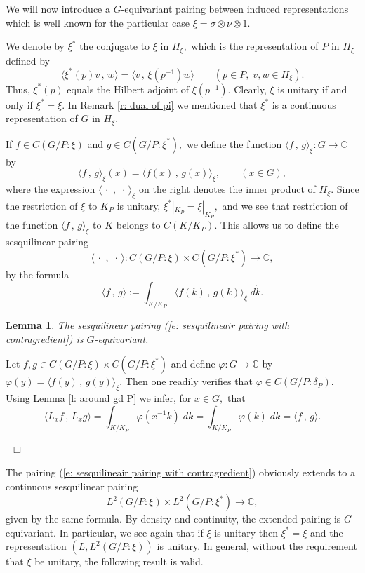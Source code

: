 \documentclass[12pt,a4paper]{article}
\newtheorem{Lemma}[Thm]{Lemma}
\newenvironment{lemma}[0]{\begin{Lemma}\noindent}%
{\end{Lemma}}
\def\proof{\par\noindent{\it Proof.}{\ }{\ }}
\def\qed{~\hfill\hbox{$\Box$}\medbreak}
\def\qquad{\quad\quad}
\def\msy#1{{\mathbb #1}}
\def\C{{\msy C}}
\def\gd{\delta}
\def\gf{\varphi}
\def\gs{\sigma}
\def\to{\rightarrow}
\def\inp#1#2{\langle#1\,,\,#2\rangle}
\numberwithin{Thm}{section}
\numberwithin{equation}{section}
\def\dotvar{\, \cdot\,}
\numberwithin{equation}{section}
\begin{document}
We will now introduce a $G$-equivariant pairing between induced 
representations which is well known for the particular case 
$\xi = \gs \otimes \nu \otimes 1.$ 

We denote by $\xi^*$ the conjugate to $\xi$ in $H_\xi,$  which is the  representation 
of $P$ in $H_\xi$ defined by 
$$ 
\inp{\xi^*(p) v}{w} = \inp{v}{\xi(p^{-1})w} \qquad (p \in P, \;v,w \in H_\xi).
$$%
Thus, $\xi^*(p)$ equals the Hilbert adjoint  of $\xi(p^{-1}).$ Clearly,  $\xi$ is unitary if and only if $\xi^* = \xi.$ In Remark \ref{r: dual of pi} we mentioned that $\xi^*$ is a continuous representation 
of $G$ in $H_\xi.$ 
  
If $f \in C(G/P: \xi)$ and $g \in C(G/P: \xi^*),$ we define
the function  $\inp{f}{g}_\xi: G \to \C$ by 
$$ 
\inp{f}{g}_\xi(x)= \inp{f(x)}{g(x)}_{\xi}, \qquad (x \in G),
$$%
where the expression $\inp{\dotvar}{\dotvar}_\xi$ on the right denotes the inner product of $H_\xi.$ 
Since the restriction of $\xi$ to $K_P$ is unitary, $\xi^*|_{K_P}  =\xi|_{K_P},$ and we see
that restriction of the function $\inp{f}{g}_\xi$ to $K$ belongs to $C(K/K_P).$ 
This allows us to define the sesquilinear pairing 
\begin{equation}
\label{e: sesquilineair pairing with contragredient} 
\inp{\dotvar}{\dotvar}:  C(G/P: \xi) \times C(G/P: \xi^*) \to \C,
\end{equation} 
by the formula
\begin{equation}
\label{e: pairing by int over K} 
 \inp{f}{g}:=  \int_{K/K_P} \inp{f(k)}{g(k)}_\xi \; d\dot{k}.
\end{equation}


\begin{lemma}
\label{l: G equivariance of sesquilinear pairing}
The sesquilinear pairing (\ref{e: sesquilineair pairing with contragredient}) is $G$-equivariant.
\end{lemma}

\proof 
Let $f ,g \in C(G/P: \xi) \times C(G/P: \xi^*)$ and define $\gf: G \to \C$ by 
$
\gf(y) = \inp{f(y)}{g(y)}_\xi.
$ 
Then one readily verifies that $\gf \in C(G/P:\gd_P).$ 
Using Lemma \ref{l: around gd P} we infer, for $x \in G,$ that
$$ 
\inp{L_x f}{L_x g} = \int_{K/K_P} \gf(x^{-1} k) \; d \dot{k} = \int_{K/K_P} \gf(k)\;d\dot{k} = \inp{f}{g}.
$$%
\vspace{-36pt}

\qed

\vspace{24pt}

The pairing (\ref{e: sesquilineair pairing with contragredient}) 
obviously extends to a continuous sesquilinear pairing 
\begin{equation}
\label{e: sesquilinear pairing L2 induced}
L^2(G/P: \xi) \times L^2(G/P: \xi^*) \to \C,
\end{equation}
given by the same formula. By density and continuity, the extended 
pairing is $G$-equivariant. In particular, we see again that if 
$\xi$ is unitary then $\xi^* = \xi$ and the representation
$(L, L^2(G/P:\xi))$ is unitary. In general, without the requirement that $\xi$ be unitary, the following result is valid.
\end{document}
